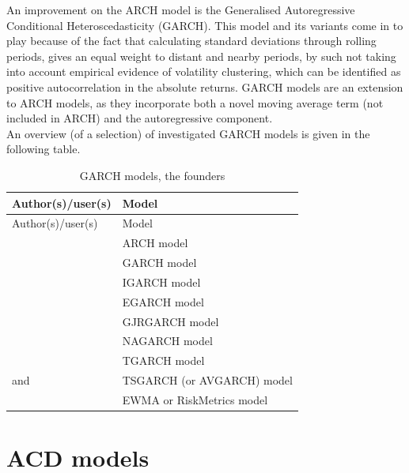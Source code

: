 \documentclass[a4paper, twoside]{templates/ociamthesis}
\begin{document}
\noindent An improvement on the ARCH model is the Generalised Autoregressive Conditional Heteroscedasticity (GARCH). This model and its variants come in to play because of the fact that calculating standard deviations through rolling periods, gives an equal weight to distant and nearby periods, by such not taking into account empirical evidence of volatility clustering, which can be identified as positive autocorrelation in the absolute returns. GARCH models are an extension to ARCH models, as they incorporate both a novel moving average term (not included in ARCH) and the autoregressive component.~\\

An overview (of a selection) of investigated GARCH models is given in the following table.

\begin{longtable}[]{@{}ll@{}}
\caption{GARCH models, the founders}\tabularnewline
\toprule
Author(s)/user(s) & Model\tabularnewline
\midrule
\endfirsthead
\toprule
Author(s)/user(s) & Model\tabularnewline
\midrule
\endhead
\textcite{engle1982} & ARCH model\tabularnewline
\textcite{bollerslev1986} & GARCH model\tabularnewline
\textcite{bollerslev1986} & IGARCH model\tabularnewline
\textcite{nelson1991} & EGARCH model\tabularnewline
\textcite{glosten1993} & GJRGARCH model\tabularnewline
\textcite{engle1993} & NAGARCH model\tabularnewline
\textcite{zakoian1994} & TGARCH model\tabularnewline
\textcite{taylor1986} and \textcite{schwert1989} & TSGARCH (or AVGARCH) model\tabularnewline
\textcite{morganguarantytrustcompany1996} & EWMA or RiskMetrics model\tabularnewline
\bottomrule
\end{longtable}

\newpage

\hypertarget{acd-models}{%
\section{ACD models}\label{acd-models}}
\end{document}
